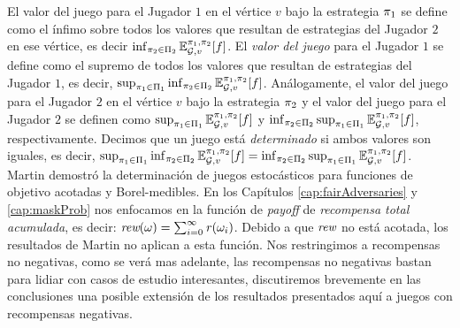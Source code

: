 El valor del juego para el Jugador $1$ en el vértice $v$ bajo la estrategia $\pi_{1}$ se define como el ínfimo sobre todos los valores que resultan de estrategias del Jugador $2$ en ese vértice, es decir $\inf_{\pi_{2} \in \Pi_{2}} \mathbb{E}^{\pi_{1}, \pi_{2}}_{\mathcal{G},v}[f]$.
El \emph{valor del juego} para el Jugador $1$ se define como el supremo de todos los valores que resultan de estrategias del Jugador $1$, es decir, $\sup_{\pi_{1} \in \Pi_{1}} \inf_{\pi_{2} \in \Pi_{2}} \mathbb{E}^{\pi_{1}, \pi_{2}}_{\mathcal{G},v}[f]$.
Análogamente, el valor del juego para el Jugador $2$ en el vértice $v$ bajo la estrategia $\pi_{2}$ y el valor del juego para el Jugador $2$ se definen como $\sup_{\pi_{1} \in \Pi_{1}}  \mathbb{E}^{\pi_{1}, \pi_{2}}_{\mathcal{G},v}[f]$ 
y $\inf_{\pi_{2} \in \Pi_{2}} \sup_{\pi_{1} \in \Pi_{1}}  \mathbb{E}^{\pi_{1}, \pi_{2}}_{\mathcal{G},v}[f]$, respectivamente. Decimos que un juego está \emph{determinado} si ambos valores son iguales, es decir,
	$\sup_{\pi_{1} \in \Pi_{1}} \inf_{\pi_{2} \in \Pi_{2}} \mathbb{E}^{\pi_{1}, \pi_{2}}_{\mathcal{G},v}[f]
	=
	\inf_{\pi_{2} \in \Pi_{2}} \sup_{\pi_{1} \in \Pi_{1}} \mathbb{E}^{\pi_{1}, \pi_{2}}_{\mathcal{G},v}[f]$.
Martin \cite{Martin98} demostró la determinación de juegos estocásticos para funciones de objetivo acotadas y Borel-medibles.
En los Capítulos \ref{cap:fairAdversaries} y \ref{cap:maskProb} nos enfocamos en la función de \textit{payoff} de \emph{recompensa total acumulada}, es decir: $\textit{rew}(\omega) = \sum^\infty_{i=0} \mathit{r}(\omega_i)$. Debido a que $\textit{rew}$ no está acotada, los resultados de Martin \cite{Martin98} no aplican a esta función. Nos restringimos a recompensas no negativas, como se verá mas adelante, las recompensas no negativas bastan para lidiar con casos de estudio interesantes, discutiremos brevemente en las conclusiones una posible extensión de los resultados presentados aquí a juegos con recompensas negativas.



	

